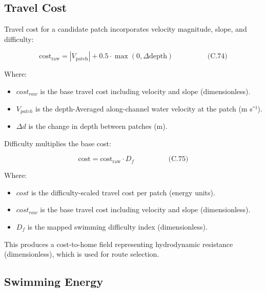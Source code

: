 \documentclass[
]{book}
\providecommand{\tightlist}{%
  \setlength{\itemsep}{0pt}\setlength{\parskip}{0pt}}
\begin{document}
\subsection{Travel Cost}\label{travel-cost}

Travel cost for a candidate patch incorporates velocity magnitude,
slope, and difficulty:

\[
\begin{equation} \text{cost}_{\text{raw}}
= |V_{\text{patch}}|
+ 0.5 \cdot \max(0, \Delta \text{depth})  \hspace{2cm} \text{(C.74)} \end{equation}
\]

Where:

\begin{itemize}
\tightlist
\item
  \(cost_{raw}\) is the base travel cost including velocity and slope
  (dimensionless).
\item
  \(V_{patch}\) is the depth-Averaged along-channel water velocity at
  the patch (m s⁻¹).
\item
  \(\Delta d\) is the change in depth between patches (m).
\end{itemize}

Difficulty multiplies the base cost:

\[
\begin{equation} \text{cost}
= \text{cost}_{\text{raw}} \cdot D_f  \hspace{2cm} \text{(C.75)} \end{equation}
\]

Where:

\begin{itemize}
\tightlist
\item
  \(cost\) is the difficulty-scaled travel cost per patch (energy
  units).
\item
  \(cost_{raw}\) is the base travel cost including velocity and slope
  (dimensionless).
\item
  \(D_f\) is the mapped swimming difficulty index (dimensionless).
\end{itemize}

This produces a cost-to-home field representing hydrodynamic resistance
(dimensionless), which is used for route selection.

\subsection{Swimming Energy}\label{swimming-energy}
\end{document}
